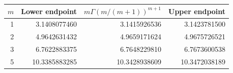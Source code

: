 \begin{tabular}{rrrr}
\toprule
$m$ & Lower endpoint & $m\Gamma(m/(m+1))^{m+1}$ & Upper endpoint\\
\midrule
1 & 3.1408077460 & 3.1415926536 & 3.1423781500\\
2 & 4.9642631432 & 4.9659171624 & 4.9675726521\\
3 & 6.7622883375 & 6.7648229810 & 6.7673600538\\
5 & 10.3385883285 & 10.3428938609 & 10.3472038189\\
\bottomrule
\end{tabular}
